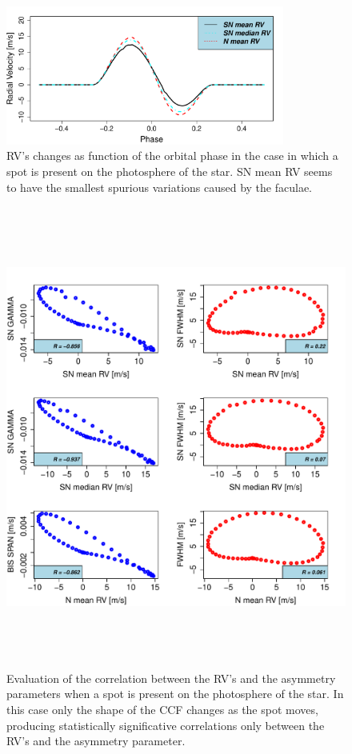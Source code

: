 \documentclass{aa}
\begin{document}
\begin{figure}[htbp]
   \centering
\includegraphics[width=3.6in]{RV_comparison_SPOT.pdf} 
\caption{RV's changes as function of the orbital phase in the case in which a spot is present on the photosphere of the star. SN mean RV seems to have the smallest spurious variations caused by the faculae.}
    \label{fig:spot}
\end{figure}

\begin{figure}[htbp]
   \centering
\includegraphics[height = 6in]{SOAP_SPOT_Comparison_para_SN.pdf} 
   \caption{Evaluation of the correlation between the RV's and the asymmetry parameters when a spot is present on the photosphere of the star. In this case only the shape of the CCF changes as the spot moves, producing statistically significative correlations only between the RV's and the asymmetry parameter.}
    \label{fig:spot.corr}
\end{figure}
\end{document}
